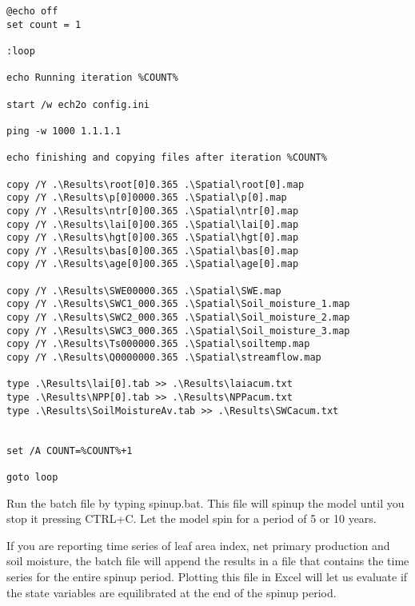 \begin{verbatim}
@echo off
set count = 1

:loop

echo Running iteration %COUNT%

start /w ech2o config.ini

ping -w 1000 1.1.1.1 

echo finishing and copying files after iteration %COUNT%

copy /Y .\Results\root[0]0.365 .\Spatial\root[0].map
copy /Y .\Results\p[0]0000.365 .\Spatial\p[0].map
copy /Y .\Results\ntr[0]00.365 .\Spatial\ntr[0].map
copy /Y .\Results\lai[0]00.365 .\Spatial\lai[0].map
copy /Y .\Results\hgt[0]00.365 .\Spatial\hgt[0].map
copy /Y .\Results\bas[0]00.365 .\Spatial\bas[0].map
copy /Y .\Results\age[0]00.365 .\Spatial\age[0].map

copy /Y .\Results\SWE00000.365 .\Spatial\SWE.map
copy /Y .\Results\SWC1_000.365 .\Spatial\Soil_moisture_1.map
copy /Y .\Results\SWC2_000.365 .\Spatial\Soil_moisture_2.map
copy /Y .\Results\SWC3_000.365 .\Spatial\Soil_moisture_3.map
copy /Y .\Results\Ts000000.365 .\Spatial\soiltemp.map
copy /Y .\Results\Q0000000.365 .\Spatial\streamflow.map

type .\Results\lai[0].tab >> .\Results\laiacum.txt
type .\Results\NPP[0].tab >> .\Results\NPPacum.txt
type .\Results\SoilMoistureAv.tab >> .\Results\SWCacum.txt


set /A COUNT=%COUNT%+1

goto loop 

\end{verbatim}

Run the batch file by typing \textsf{spinup.bat}. This file will spinup the model until you stop it pressing \textsf{CTRL+C}. Let the model spin for a period of 5 or 10 years.

If you are reporting time series of leaf area index, net primary production and soil moisture, the batch file will append the results in a file that contains the time series for the entire spinup period. Plotting this file in Excel will let us evaluate if the state variables are equilibrated at the end of the spinup period. 







  




